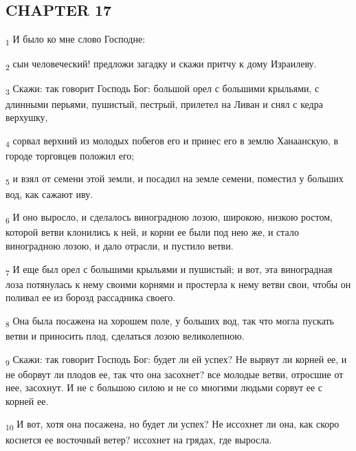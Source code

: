 \subsection{CHAPTER 17}
\begin{tcolorbox}
\textsubscript{1} И было ко мне слово Господне:
\end{tcolorbox}
\begin{tcolorbox}
\textsubscript{2} сын человеческий! предложи загадку и скажи притчу к дому Израилеву.
\end{tcolorbox}
\begin{tcolorbox}
\textsubscript{3} Скажи: так говорит Господь Бог: большой орел с большими крыльями, с длинными перьями, пушистый, пестрый, прилетел на Ливан и снял с кедра верхушку,
\end{tcolorbox}
\begin{tcolorbox}
\textsubscript{4} сорвал верхний из молодых побегов его и принес его в землю Ханаанскую, в городе торговцев положил его;
\end{tcolorbox}
\begin{tcolorbox}
\textsubscript{5} и взял от семени этой земли, и посадил на земле семени, поместил у больших вод, как сажают иву.
\end{tcolorbox}
\begin{tcolorbox}
\textsubscript{6} И оно выросло, и сделалось виноградною лозою, широкою, низкою ростом, которой ветви клонились к ней, и корни ее были под нею же, и стало виноградною лозою, и дало отрасли, и пустило ветви.
\end{tcolorbox}
\begin{tcolorbox}
\textsubscript{7} И еще был орел с большими крыльями и пушистый; и вот, эта виноградная лоза потянулась к нему своими корнями и простерла к нему ветви свои, чтобы он поливал ее из борозд рассадника своего.
\end{tcolorbox}
\begin{tcolorbox}
\textsubscript{8} Она была посажена на хорошем поле, у больших вод, так что могла пускать ветви и приносить плод, сделаться лозою великолепною.
\end{tcolorbox}
\begin{tcolorbox}
\textsubscript{9} Скажи: так говорит Господь Бог: будет ли ей успех? Не вырвут ли корней ее, и не оборвут ли плодов ее, так что она засохнет? все молодые ветви, отросшие от нее, засохнут. И не с большою силою и не со многими людьми сорвут ее с корней ее.
\end{tcolorbox}
\begin{tcolorbox}
\textsubscript{10} И вот, хотя она посажена, но будет ли успех? Не иссохнет ли она, как скоро коснется ее восточный ветер? иссохнет на грядах, где выросла.
\end{tcolorbox}
